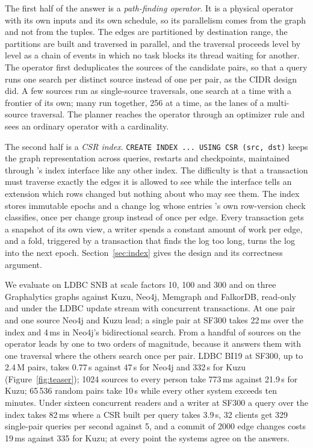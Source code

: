 The first half of the answer is a \emph{path-finding operator}. It is a physical operator with its own inputs and its
own schedule, so its parallelism comes from the graph and not from the tuples. The edges are partitioned by
destination range, the partitions are built and traversed in parallel, and the traversal proceeds level by level as a
chain of \duckdb events in which no task blocks its thread waiting for another. The operator first deduplicates the
sources of the candidate pairs, so that a query runs one search per distinct source instead of one per pair, as the
CIDR design did. A few sources run as single-source traversals, one search at a time with a frontier of its own; many
run together, 256 at a time, as the lanes of a multi-source traversal. The planner reaches the operator through an
optimizer rule and sees an ordinary operator with a cardinality.

The second half is a \emph{CSR index}. \texttt{CREATE INDEX ... USING CSR (src, dst)} keeps the graph representation
across queries, restarts and checkpoints, maintained through \duckdb's index interface like any other index. The difficulty is that a transaction must traverse exactly the edges it is allowed to see while the interface tells an extension which rows changed but nothing about who may see them. The index stores immutable epochs and a
change log whose entries \duckdb's own row-version check classifies, once per change group instead of once per edge.
Every transaction gets a snapshot of its own view, a writer spends a constant amount of work per edge, and a fold,
triggered by a transaction that finds the log too long, turns the log into the next epoch. Section~\ref{sec:index}
gives the design and its correctness argument.

We evaluate on LDBC SNB at scale factors 10, 100 and 300 and on three Graphalytics graphs against Kuzu, Neo4j,
Memgraph and FalkorDB, read-only and under the LDBC update stream with concurrent transactions. At one pair and one
source Neo4j and Kuzu lead; a single pair at SF300 takes 22\,ms over the index and 4\,ms in Neo4j's bidirectional
search. From a handful of sources on the operator leads by one to two orders of magnitude, because it answers them
with one traversal where the others search once per pair. LDBC BI19 at SF300, up to 2.4\,M pairs, takes 0.77\,s
against 47\,s for Neo4j and 332\,s for Kuzu (Figure~\ref{fig:teaser}); 1024 sources to every person take 773\,ms
against 21.9\,s for Kuzu; 65\,536 random pairs take 10\,s while every other system exceeds ten minutes. Under sixteen
concurrent readers and a writer at SF300 a query over the index takes 82\,ms where a CSR built per query takes
3.9\,s, 32 clients get 329 single-pair queries per second against 5, and a commit of 2000 edge changes costs 19\,ms
against 335 for Kuzu; at every point the systems agree on the answers.

